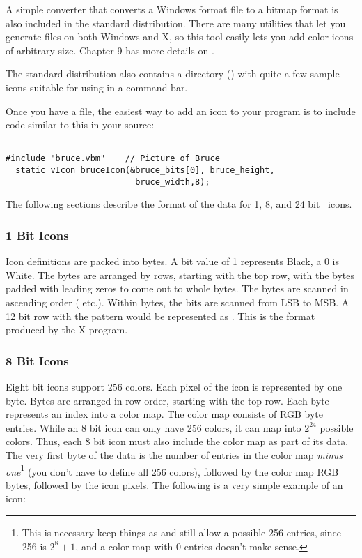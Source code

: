 A simple converter that converts a Windows  format file
to a \V {} \V bitmap format is also included in the
standard \V distribution. There are many utilities that let
you generate  files on both Windows and X, so this
tool easily lets you add color icons of arbitrary size. 
Chapter 9 has more details on .

The standard \V distribution also contains a directory 
() with quite a few sample icons suitable for using
in a command bar.

Once you have a  file, the easiest way to add an icon
to your program is to include code similar to this in your source:

\footnotesize
\begin{verbatim}

#include "bruce.vbm"    // Picture of Bruce
  static vIcon bruceIcon(&bruce_bits[0], bruce_height,
                          bruce_width,8);

\end{verbatim}
\normalfont\normalsize


The following sections describe the format of the
 data for 1, 8, and 24 bit
\V\ icons.

\subsubsection*{1 Bit Icons}

Icon definitions are packed into bytes. A bit value of 1
represents Black, a 0 is White. The bytes are arranged by rows,
starting with the top row, with the bytes padded with leading
zeros to come out to whole bytes. The bytes are scanned in
ascending order ( etc.). Within bytes,
the bits are scanned from LSB to MSB. A 12 bit row with the
pattern  would be represented as  . This is the format
produced by the X  program.

\subsubsection*{8 Bit Icons}

Eight bit icons support 256 colors. Each pixel of the icon is
represented by one byte. Bytes are arranged in row order,
starting with the top row. Each byte represents an index into a
color map. The color map consists of RGB byte entries.
While an 8 bit icon can only have 256 colors, it can map into
$2^{24}$ possible colors. Thus, each 8 bit icon must also include
the color map as part of its data.
The very first byte of the  data is the number of
entries in the color map \emph{minus one}\footnote{This is
necessary keep things as  and still allow a possible
256 entries, since 256 is $2^{8}+1$, and a color map with 0
entries doesn't make sense.} (you don't have to define all 256
colors), followed by the color map RGB bytes, followed by the
icon pixels. The following is a very simple example of an icon:

